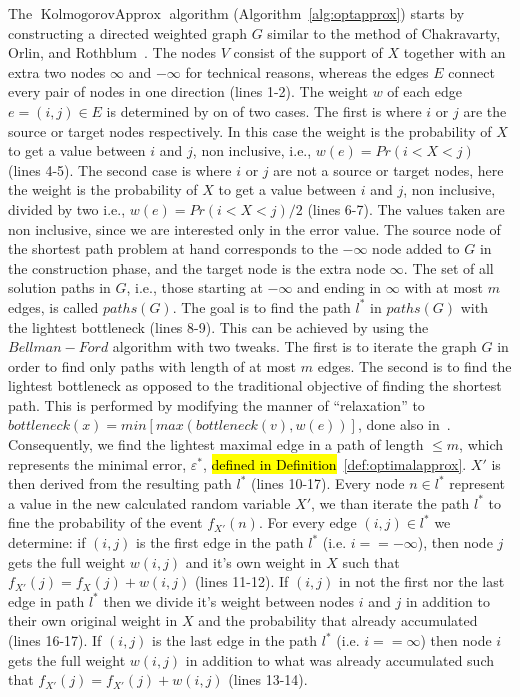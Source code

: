 \documentclass{article}
\DeclareMathOperator{\KlmApprox}{KolmogorovApprox}
\begin{document}
The $\KlmApprox$ algorithm (Algorithm~\ref{alg:optapprox}) starts by constructing a directed weighted graph $G$ similar to the method of Chakravarty, Orlin, and Rothblum~\cite{chakravarty1982partitioning}. The nodes $V$ consist of the support of $X$ together with an extra two nodes $\infty$ and $-\infty$ for technical reasons, whereas the edges $E$ connect every pair of nodes in one direction (lines 1-2). The weight $w$ of each edge $e=(i,j)\in E$ is determined by on of two cases. The first is where $i$ or $j$ are the source or target nodes respectively. In this case the weight is the probability of $X$ to get a value between $i$ and $j$, non inclusive, i.e., $w(e)=Pr(i<X<j)$ (lines 4-5). The second case is where $i$ or $j$ are not a source or target nodes, here the weight is the probability of $X$ to get a value between $i$ and $j$, non inclusive, divided by two i.e., $w(e)=Pr(i<X<j)/2$ (lines 6-7). The values taken are non inclusive, since we are interested only in the error value.
The source node of the shortest path problem at hand corresponds to the $-\infty$ node added to $G$ in the construction phase, and the target node is the extra node $\infty$.
The set of all solution paths in $G$, i.e., those starting at $-\infty$ and ending in $\infty$ with at most $m$ edges, is called $paths(G)$. The goal is to find the path $l^*$ in $paths(G)$ with the lightest bottleneck (lines 8-9). This can be achieved by using the $Bellman-Ford$ algorithm with two tweaks. The first is to iterate the graph $G$ in order to find only paths with length of at most $m$ edges. The second is to find the lightest bottleneck as opposed to the traditional objective of finding the shortest path. This is performed by modifying the manner of ``relaxation'' to $bottleneck(x) = min[max(bottleneck(v),w(e))]$, done also in~\cite{shufan2011two}. Consequently, we find the lightest maximal edge in a path of length $\leq m$, which represents the minimal error, $\varepsilon^*$, \hl{defined in Definition}~\ref{def:optimalapprox}. $X'$ is then derived from the resulting path $l^*$ (lines 10-17). Every node $n \in l^*$ represent a value in the new calculated random variable $X'$, we than iterate the path $l^*$ to fine the probability of the event $f_{X'}(n)$. For every edge $(i,j)\in l^*$ we determine: if $(i,j)$ is the first edge in the path $ l^*$ (i.e.  $i==-\infty$), then node $j$ gets the full weight $w(i,j)$ and it's own weight in $X$ such that $f_{X'}(j) = f_{X}(j) +  w(i,j)$ (lines 11-12). If $(i,j)$ in not the first nor the last edge in path $l^*$ then we divide it's weight between nodes $i$ and $j$ in addition to their own original weight in $X$ and the probability that already accumulated (lines 16-17). If $(i,j)$ is the last edge in the path $ l^*$ (i.e.  $i==\infty$) then node $i$ gets the full weight $w(i,j)$ in addition to what was already accumulated such that $f_{X'}(j) = f_{X'}(j) +  w(i,j)$ (lines 13-14).
\end{document}
